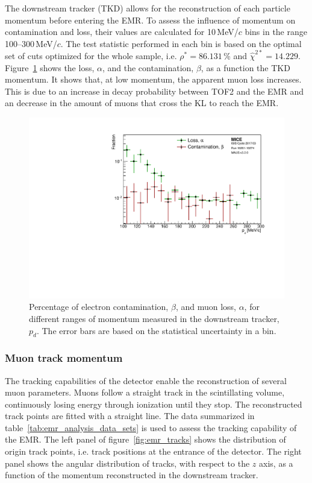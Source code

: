 The downstream tracker (TKD) allows for the reconstruction of each particle momentum before entering the EMR. To assess the influence of momentum on contamination and loss, their values are calculated for 10\,MeV/$c$ bins in the range 100--300\,MeV/$c$. The test statistic performed in each bin is based on the optimal set of cuts optimized for the whole sample, i.e. $\rho^*=86.131$\,\% and $\hat{\chi}^{2*}=14.229$. Figure~\ref{fig:emr_pid_mom} shows the loss, $\alpha$, and the contamination, $\beta$, as a function the TKD momentum. It shows that, at low momentum, the apparent muon loss increases. This is due to an increase in decay probability between TOF2 and the EMR and an decrease in the amount of muons that cross the KL to reach the EMR.

\begin{figure}[htb!]
	\begin{center}
		\includegraphics[width=0.7\columnwidth]{pid_mom.pdf}  		
		\caption{Percentage of electron contamination, $\beta$, and muon loss, $\alpha$, for different ranges of momentum measured in the downstream tracker, $p_d$. The error bars are based on the statistical uncertainty in a bin.}
		\label{fig:emr_pid_mom}
	\end{center}
\end{figure}

\subsubsection{Muon track momentum}
The tracking capabilities of the detector enable the reconstruction of several muon parameters. Muons follow a straight track in the scintillating volume, continuously losing energy through ionization until they stop. The reconstructed track points are fitted with a straight line. The data summarized in table~\ref{tab:emr_analysis_data_sets} is used to assess the tracking capability of the EMR. The left panel of figure~\ref{fig:emr_tracks} shows the distribution of origin track points, i.e. track positions at the entrance of the detector. The right panel shows the angular distribution of tracks, with respect to the $z$ axis, as a function of the momentum reconstructed in the downstream tracker.

